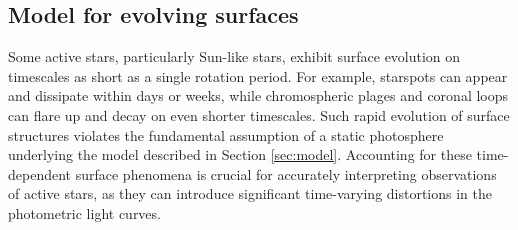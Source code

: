 \documentclass[twocolumn]{aastex631}
\begin{document}

\subsection{Model for evolving surfaces}
\label{sec:evolmodel}
Some active stars, particularly Sun-like stars, exhibit surface evolution on timescales as short as a single rotation period. For example, starspots can appear and dissipate within days or weeks, 
while chromospheric plages and coronal loops can flare up and decay on even shorter timescales. Such rapid evolution of surface structures violates 
the fundamental assumption of a static photosphere underlying the model described in Section \ref{sec:model}. 
Accounting for these time-dependent surface phenomena is crucial for accurately interpreting observations of active stars, as they can introduce significant 
time-varying distortions in the photometric light curves. 
\end{document}
